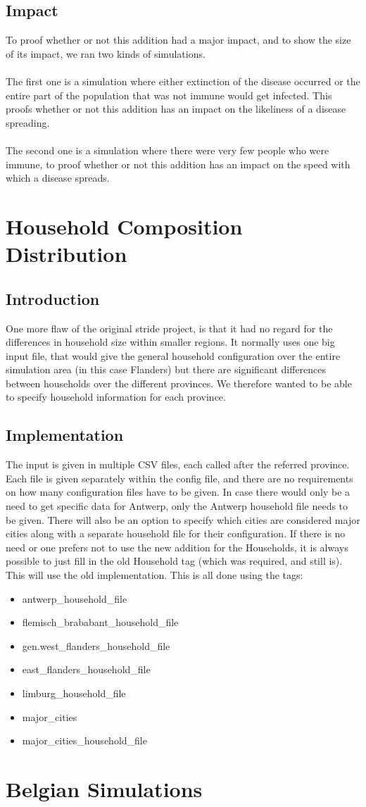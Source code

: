 \documentclass[runningheads]{llncs}
\begin{document}
	\subsection{Impact}
	To proof whether or not this addition had a major impact, and to show the size of its impact, we ran two kinds of simulations.\\
	\\
	The first one is a simulation where either extinction of the disease occurred or the entire part of the population that was not immune would get infected. This proofs whether or not this addition has an impact on the likeliness of a disease spreading.\\
	\\
	The second one is a simulation where there were very few people who were immune, to proof whether or not this addition has an impact on the speed with which a disease spreads.
	\section{Household Composition Distribution}
	\subsection{Introduction}
	One more flaw of the original stride project, is that it had no regard for the differences in household size within smaller regions. It normally uses one big input file, that would give the general household configuration over the entire simulation area (in this case Flanders) but there are significant differences between households over the different provinces. We therefore wanted to be able to specify household information for each province.
	\subsection{Implementation}
	The input is given in multiple CSV files, each called after the referred province. Each file is given separately within the config file, and there are no requirements on how many configuration files have to be given. In case there would only be a need to get specific data for Antwerp, only the Antwerp household file needs to be given. There will also be an option to specify which cities are considered major cities along with a separate household file for their configuration. If there is no need or one prefers not to use the new addition for the Households, it is always possible to just fill in the old Household tag (which was required, and still is). This will use the old implementation. This is all done using the tags:
	\begin{itemize}
		\item antwerp\_household\_file
		\item flemisch\_brababant\_household\_file
		\item gen.west\_flanders\_household\_file
		\item east\_flanders\_household\_file
		\item limburg\_household\_file
		\item major\_cities
		\item major\_cities\_household\_file
	\end{itemize}
	\section{Belgian Simulations}
	
\end{document}
